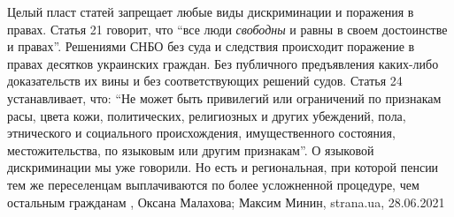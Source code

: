 Целый пласт статей запрещает любые виды дискриминации и поражения в правах.
Статья 21 говорит, что \enquote{все люди \emph{свободны} и равны в своем достоинстве и
правах}.  Решениями СНБО без суда и следствия происходит поражение в правах
десятков украинских граждан. Без публичного предъявления каких-либо
доказательств их вины и без соответствующих решений судов.  Статья 24
устанавливает, что: \enquote{Не может быть привилегий или ограничений по признакам
расы, цвета кожи, политических, религиозных и других убеждений, пола,
этнического и социального происхождения, имущественного состояния,
местожительства, по языковым или другим признакам}.  О языковой дискриминации
мы уже говорили. Но есть и региональная, при которой пенсии тем же переселенцам
выплачиваются по более усложненной процедуре, чем остальным гражданам
, 
Оксана Малахова; Максим Минин, strana.ua, 28.06.2021

